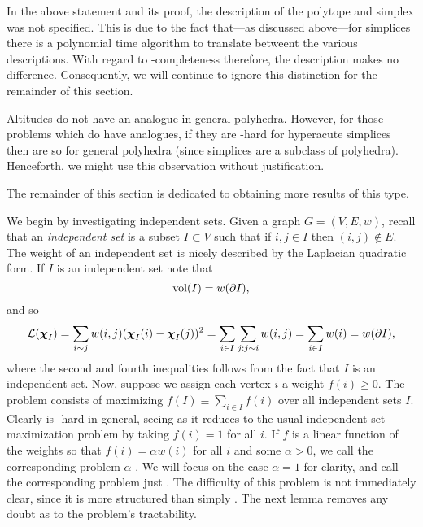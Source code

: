 \begin{remark} In  the above statement and its proof, the description of the polytope and simplex was not specified. This is due to the fact that---as discussed above---for simplices there is a polynomial time algorithm to translate betweent the various descriptions. With regard to \NP-completeness therefore, the description makes no difference. Consequently, we will continue to ignore this distinction for the remainder of this section. 
\end{remark}


\begin{remark}
Altitudes do  not have  an analogue in general polyhedra. However, for  those problems which do have analogues, 
if they are \NP-hard for hyperacute simplices then are so for general polyhedra (since simplices are a subclass of polyhedra). Henceforth, we might use this observation  without justification. 
\end{remark}


The remainder of this section is dedicated to obtaining more results of this type. 

We begin by investigating independent sets. Given a graph $G=(V,E,w)$, recall that an \emph{independent set} is a subset $I\subset V$ such that if $i,j\in I$ then $(i,j)\notin E$. 
The weight of an independent set is nicely described by the Laplacian quadratic form. If $I$ is an independent set note that 
\[\textnormal{vol}(I) = w(\partial I),\] 
and so 
\begin{align*}
    \mathcal{L}(\boldsymbol{\chi}_I) = \sum_{i\sim j}w(i,j)(\boldsymbol{\chi}_I(i)-\boldsymbol{\chi}_I(j))^2 = \sum_{i\in I}\sum_{j:j\sim i} w(i,j) = \sum_{i\in I}w(i)=w(\partial I),
\end{align*}
where the second and fourth inequalities follows from the fact that $I$ is an independent set. Now, suppose we assign each vertex $i$ a weight $f(i)\geq 0$. The \mwis problem consists of maximizing $f(I)\equiv \sum_{i\in I}f(i)$ over all independent sets $I$. Clearly \mwis is \NP-hard in general, seeing as it reduces to the usual independent set maximization problem by taking $f(i)=1$ for all $i$. If $f$ is a linear function of the weights so that $f(i)=\alpha w(i)$ for all $i$ and some $\alpha> 0$, we call the corresponding problem $\alpha$-\vwis. We will focus on the case $\alpha=1$ for clarity, and call the  corresponding problem just \vwis. The difficulty of this problem is not immediately clear, since it is more structured than simply \mwis. The next lemma removes any doubt as to the problem's tractability.   

